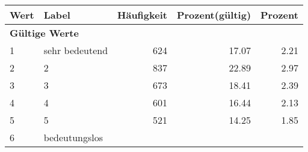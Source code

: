      \begin{longtable}{lXrrr}
     \toprule
     \textbf{Wert} & \textbf{Label} & \textbf{Häufigkeit} & \textbf{Prozent(gültig)} & \textbf{Prozent} \\
     \endhead
     \midrule
     \multicolumn{5}{l}{\textbf{Gültige Werte}}\\

     1 &
     \multicolumn{1}{X}{ sehr bedeutend   } &


       \num{624} &
       \num[round-mode=places,round-precision=2]{17,07} &
         \num[round-mode=places,round-precision=2]{2,21} \\

     2 &
     \multicolumn{1}{X}{ 2   } &


       \num{837} &
       \num[round-mode=places,round-precision=2]{22,89} &
         \num[round-mode=places,round-precision=2]{2,97} \\

     3 &
     \multicolumn{1}{X}{ 3   } &


       \num{673} &
       \num[round-mode=places,round-precision=2]{18,41} &
         \num[round-mode=places,round-precision=2]{2,39} \\

     4 &
     \multicolumn{1}{X}{ 4   } &


       \num{601} &
       \num[round-mode=places,round-precision=2]{16,44} &
         \num[round-mode=places,round-precision=2]{2,13} \\

     5 &
     \multicolumn{1}{X}{ 5   } &


       \num{521} &
       \num[round-mode=places,round-precision=2]{14,25} &
         \num[round-mode=places,round-precision=2]{1,85} \\

     6 &
     \multicolumn{1}{X}{ bedeutungslos   } &



\end{longtable}
